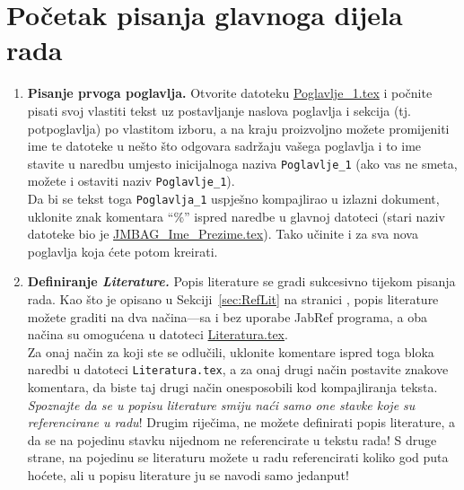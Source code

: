\section{Početak pisanja glavnoga dijela rada}
\begin{enumerate}
	\item {\color{red} \textbf{Pisanje prvoga poglavlja.}} Otvorite datoteku  \href{run:Poglavlje\_1.tex}{{\color{blue}Poglavlje\_1.tex}} i počnite pisati svoj vlastiti tekst uz postavljanje naslova poglavlja i sekcija (tj. potpoglavlja) po vlastitom izboru, a na kraju proizvoljno možete promijeniti ime te datoteke u nešto što odgovara sadržaju vašega poglavlja i to ime stavite u \verb|| naredbu umjesto inicijalnoga naziva \verb|Poglavlje_1| (ako vas ne smeta, možete i ostaviti naziv \verb|Poglavlje_1|).\\ Da bi se tekst toga \verb|Poglavlja_1| uspješno kompajlirao u izlazni dokument, uklonite znak komentara ``\%'' ispred \verb|| naredbe u glavnoj datoteci (stari naziv datoteke bio je  \href{run:JMBAG\_Ime\_Prezime.tex}{{\color{blue}JMBAG\_Ime\_Prezime.tex}}). Tako učinite i za sva nova poglavlja koja ćete potom kreirati.
	\item {\color{red} \textbf{Definiranje \emph{Literature.}}} Popis literature se gradi sukcesivno tijekom pisanja rada. Kao što je opisano u Sekciji~\ref{sec:RefLit} na stranici \pageref{sec:RefLit}, popis literature možete graditi na dva načina---sa i bez uporabe JabRef programa, a oba načina su omogućena u datoteci \href{run:Literatura.tex}{{\color{blue}Literatura.tex}}.\\ 
	Za onaj način za koji ste se odlučili, uklonite komentare ispred toga bloka naredbi u datoteci \verb|Literatura.tex|, a za onaj drugi način postavite znakove komentara, da biste taj drugi način onesposobili kod kompajliranja teksta.\\
	\emph{Spoznajte da se u popisu literature smiju naći samo one stavke koje su referencirane u radu}! Drugim riječima, ne možete definirati popis literature, a da se na pojedinu stavku nijednom ne referencirate u tekstu rada! S druge strane, na pojedinu se literaturu možete u radu referencirati koliko god puta hoćete, ali u popisu literature ju se navodi samo jedanput!
	

\end{enumerate}

